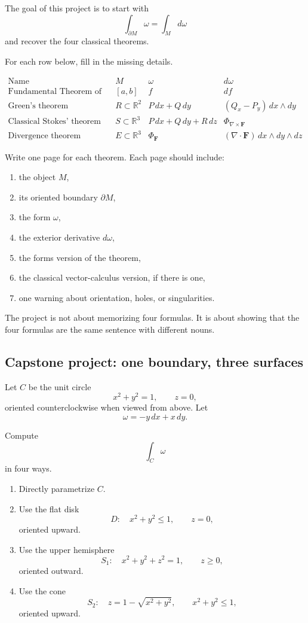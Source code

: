 The goal of this project is to start with
\[
    \int_{\partial M}\omega=\int_M d\omega
\]
and recover the four classical theorems.

For each row below, fill in the missing details.

\[
\begin{array}{c|c|c|c}
\text{Name} & M & \omega & d\omega \\ \hline
\text{Fundamental Theorem of Calculus}
& [a,b]
& f
& df
\\[1mm]
\text{Green's theorem}
& R\subset\mathbb R^2
& P\,dx+Q\,dy
& (Q_x-P_y)\,dx\wedge dy
\\[1mm]
\text{Classical Stokes' theorem}
& S\subset\mathbb R^3
& P\,dx+Q\,dy+R\,dz
& \Phi_{\nabla\times\mathbf F}
\\[1mm]
\text{Divergence theorem}
& E\subset\mathbb R^3
& \Phi_{\mathbf F}
& (\nabla\cdot\mathbf F)\,dx\wedge dy\wedge dz
\end{array}
\]

Write one page for each theorem.  Each page should include:

\begin{enumerate}
\item the object \(M\),
\item its oriented boundary \(\partial M\),
\item the form \(\omega\),
\item the exterior derivative \(d\omega\),
\item the forms version of the theorem,
\item the classical vector-calculus version, if there is one,
\item one warning about orientation, holes, or singularities.
\end{enumerate}

The project is not about memorizing four formulas.  It is about showing that the four
formulas are the same sentence with different nouns.

\subsection{Capstone project: one boundary, three surfaces}

Let \(C\) be the unit circle
\[
    x^2+y^2=1,\qquad z=0,
\]
oriented counterclockwise when viewed from above.  Let
\[
    \omega=-y\,dx+x\,dy.
\]

Compute
\[
    \int_C\omega
\]
in four ways.

\begin{enumerate}
\item Directly parametrize \(C\).

\item Use the flat disk
\[
    D:\quad x^2+y^2\le1,\qquad z=0,
\]
oriented upward.

\item Use the upper hemisphere
\[
    S_1:\quad x^2+y^2+z^2=1,\qquad z\ge0,
\]
oriented outward.

\item Use the cone
\[
    S_2:\quad z=1-\sqrt{x^2+y^2},\qquad x^2+y^2\le1,
\]
oriented upward.
\end{enumerate}

